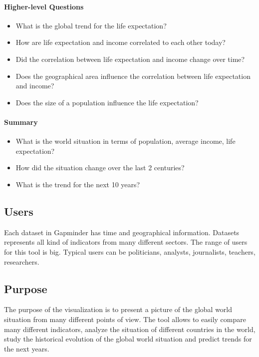 \paragraph{Higher-level Questions}
\begin{itemize}

    \item What is the global trend for the life expectation?

    \item How are life expectation and income correlated to each other today?    
    \item Did the correlation between life expectation and income change over time?
    \item Does the geographical area influence the correlation between life expectation and income?
    \item Does the size of a population influence the life expectation?
    
\end{itemize}

\paragraph{Summary}
\begin{itemize}    
    \item What is the world situation in terms of population, average income, life expectation?
    \item How did the situation change over the last 2 centuries?
    \item What is the trend for the next 10 years?
\end{itemize}

\subsection{Users}
Each dataset in Gapminder has time and geographical information.
Datasets represents all kind of indicators from many different sectors.
The range of users for this tool is big.
Typical users can be politicians, analysts, journalists, teachers, researchers.

\subsection{Purpose}
The purpose of the visualization is to present a picture of the global world situation from many different points of view.
The tool allows to easily compare many different indicators, analyze the situation of different countries in the world, study the historical evolution of the global world situation and predict trends for the next years.

